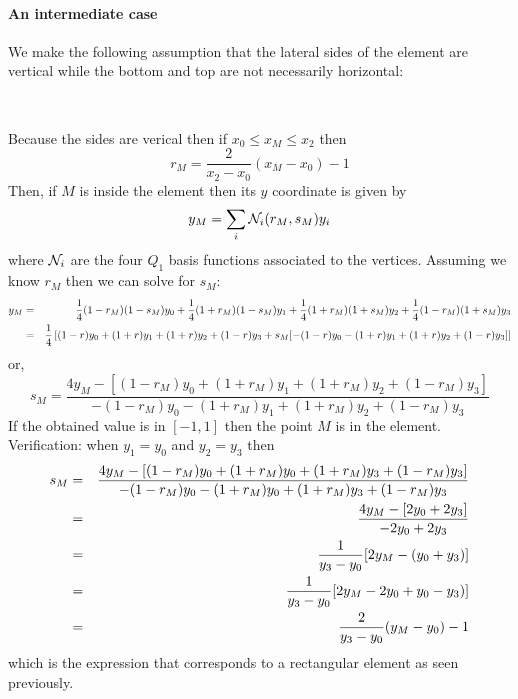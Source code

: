 \paragraph{An intermediate case} We make the following assumption that the lateral sides of the  
element are vertical while the bottom and top are not necessarily horizontal:

\begin{center}
\\
\end{center}

\noindent Because the sides are verical then if $x_0 \leq x_M \leq x_2$ then 
\[
r_M = \frac{2}{x_2-x_0}(x_M-x_0) -1 
\]
Then, if $M$ is inside the element then its $y$ coordinate is given by
\[
y_M = \sum_i {\mathcal{N}}_i(r_M,s_M) y_i
\]
where ${\mathcal{N}}_i$ are the four $Q_1$ basis functions associated to the vertices.
Assuming we know $r_M$ then we can solve for $s_M$:
\begin{eqnarray}
y_M &=&  
\frac{1}{4}(1-r_M)(1-s_M) y_0+
\frac{1}{4}(1+r_M)(1-s_M) y_1+
\frac{1}{4}(1+r_M)(1+s_M) y_2+
\frac{1}{4}(1-r_M)(1+s_M) y_3 \nonumber\\
&=& 
\frac{1}{4} \left[
(1-r)y_0+(1+r)y_1+(1+r)y_2+(1-r)y_3 +s_M [ -(1-r)y_0 - (1+r)y_1+(1+r)y_2+(1-r)y_3  ] 
\right] \nonumber 
\end{eqnarray}
or, 
\[
s_M = \frac{ 4y_M - [(1-r_M)y_0+(1+r_M)y_1+(1+r_M)y_2+(1-r_M)y_3]  }{ -(1-r_M)y_0 -(1+r_M)y_1+(1+r_M)y_2+(1-r_M)y_3 } 
\]
If the obtained value is in $[-1,1]$ then the point $M$ is in the element.
Verification: when $y_1=y_0$ and $y_2=y_3$ then 
\begin{eqnarray}
s_M 
&=& \frac{4 y_M - [(1-r_M)y_0+(1+r_M)y_0+(1+r_M)y_3+(1-r_M)y_3]  }{ -(1-r_M)y_0 - (1+r_M)y_0+(1+r_M)y_3+(1-r_M)y_3 } \nonumber\\
&=& \frac{4 y_M - [ 2 y_0 + 2 y_3]  }{ -2 y_0 + 2 y_3    }  \nonumber\\
&=& \frac{1}{y_3-y_0} [2 y_M - (  y_0 +  y_3) ] \nonumber\\ 
&=& \frac{1}{y_3-y_0} [2 y_M -  2 y_0 +y_0 -  y_3)  ] \nonumber\\ 
&=& \frac{2}{y_3-y_0} (y_M - y_0) - 1 
\end{eqnarray}
which is the expression that corresponds to a rectangular element as seen previously.

